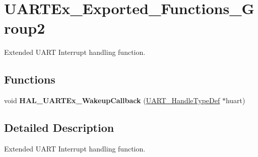 \hypertarget{group___u_a_r_t_ex___exported___functions___group2}{}\section{U\+A\+R\+T\+Ex\+\_\+\+Exported\+\_\+\+Functions\+\_\+\+Group2}
\label{group___u_a_r_t_ex___exported___functions___group2}


Extended U\+A\+RT Interrupt handling function.  


\subsection*{Functions}
\begin{DoxyCompactItemize}
\item 
\mbox{\label{group___u_a_r_t_ex___exported___functions___group2_ga44d09cdf66fec468d956c64a23f61856}} 
void {\bfseries H\+A\+L\+\_\+\+U\+A\+R\+T\+Ex\+\_\+\+Wakeup\+Callback} (\hyperlink{struct_u_a_r_t___handle_type_def}{U\+A\+R\+T\+\_\+\+Handle\+Type\+Def} $\ast$huart)
\end{DoxyCompactItemize}


\subsection{Detailed Description}
Extended U\+A\+RT Interrupt handling function. 

